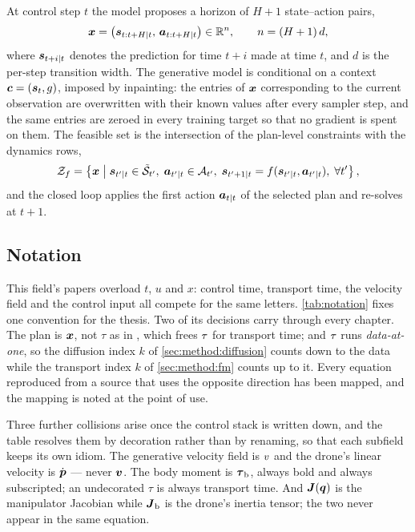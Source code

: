 At control step $t$ the model proposes a horizon of $H+1$ state--action pairs,
\begin{equation}\label{eq:method:plan}
  \boldsymbol{x}
  = \left(\boldsymbol{s}_{t:t+H|t},\,\boldsymbol{a}_{t:t+H|t}\right) \in \mathbb{R}^{n},
  \qquad n = (H+1)\,d,
\end{equation}
where $\boldsymbol{s}_{t+i|t}$ denotes the prediction for time $t+i$ made at time $t$, and $d$ is the
per-step transition width. The generative model is conditional on a context
$\boldsymbol{c} = (\boldsymbol{s}_{t},g)$, imposed by inpainting: the entries of $\boldsymbol{x}$ corresponding to
the current observation are overwritten with their known values after every sampler step, and
the same entries are zeroed in every training target so that no gradient is spent on them.
The feasible set is the intersection of the plan-level constraints with the dynamics rows,
\begin{equation}\label{eq:method:feasible}
  \mathcal{Z}_{f} = \left\{\boldsymbol{x} \;\middle|\;
    \boldsymbol{s}_{t'|t}\in\tilde{\mathcal{S}}_{t'},\;
    \boldsymbol{a}_{t'|t}\in\mathcal{A}_{t'},\;
    \boldsymbol{s}_{t'+1|t} = f(\boldsymbol{s}_{t'|t},\boldsymbol{a}_{t'|t}),\;
    \forall t'\right\},
\end{equation}
and the closed loop applies the first action $\boldsymbol{a}_{t|t}$ of the selected plan and re-solves
at $t+1$.

\subsection{Notation}

This field's papers overload $t$, $u$ and $x$: control time, transport time, the velocity field
and the control input all compete for the same letters. \autoref{tab:notation} fixes one
convention for the thesis. Two of its decisions carry through every chapter. The plan is
$\boldsymbol{x}$, not $\tau$ as in \parencite{romer2025diffusion}, which frees $\tau$ for transport time;
and $\tau$ runs \emph{data-at-one}, so the diffusion index $k$ of \autoref{sec:method:diffusion}
counts down to the data while the transport index $k$ of \autoref{sec:method:fm} counts up to it. Every
equation reproduced from a source that uses the opposite direction has been mapped, and the
mapping is noted at the point of use.

Three further collisions arise once the control stack is written down, and the table resolves them
by decoration rather than by renaming, so that each subfield keeps its own idiom. The generative
velocity field is $v$ and the drone's linear velocity is $\dot{\boldsymbol{p}}$ --- never $\boldsymbol{v}$.
The body moment is $\boldsymbol{\tau}_{\textrm{b}}$, always bold and always subscripted; an undecorated $\tau$
is always transport time. And $\boldsymbol{J}(\boldsymbol{q})$ is the manipulator Jacobian while
$\boldsymbol{J}_{\textrm{b}}$ is the drone's inertia tensor; the two never appear in the same equation.

